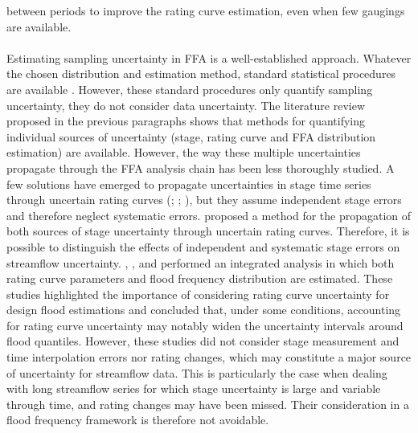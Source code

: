 \documentclass[11pt]{article}
\begin{document}
between periods to improve the rating curve estimation, even when few gaugings are available.
    
    \paragraph{}
    Estimating sampling uncertainty in FFA is a well-established approach. Whatever the chosen distribution and estimation method, standard statistical procedures are available \citep{coles_classical_2001}. However, these standard procedures only quantify sampling uncertainty, they do not consider data uncertainty. The literature review proposed in the previous paragraphs shows that methods for quantifying individual sources of uncertainty (stage, rating curve and FFA distribution estimation) are available. However, the way these multiple uncertainties propagate through the FFA analysis chain has been less thoroughly studied. A few solutions have emerged to propagate uncertainties in stage time series through uncertain rating curves (\citet{dymond_accuracy_1982}; \citet{herschy_hydrometry_1998}; \citet{petersen-overleir_uncertainty_2005}), but they assume independent stage errors and therefore neglect systematic errors. \citet{horner_impact_2018} proposed a method for the propagation of both sources of stage uncertainty through uncertain rating curves. Therefore, it is possible to distinguish the effects of independent and systematic stage errors on streamflow uncertainty. \citet{petersen-overleir_accounting_2009}, \citet{steinbakk_propagation_2016}, and \citet{vieira_assessing_2022} performed an integrated analysis in which both rating curve parameters and flood frequency distribution are estimated. These studies highlighted the importance of considering rating curve uncertainty for design flood estimations and concluded that, under some conditions, accounting for rating curve uncertainty may notably widen the uncertainty intervals around flood quantiles. However, these studies did not consider stage measurement and time interpolation errors nor rating changes, which may constitute a major source of uncertainty for streamflow data. This is particularly the case when dealing with long streamflow series for which stage uncertainty is large and variable through time, and rating changes may have been missed. Their consideration in a flood frequency framework is therefore not avoidable. 
        
\end{document}
